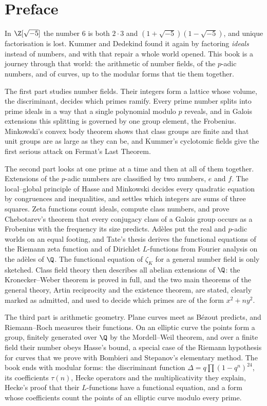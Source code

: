 \chapter*{Preface}
In $\Z[\sqrt{-5}]$ the number $6$ is both $2\cdot3$ and $(1+\sqrt{-5})(1-\sqrt{-5})$, and unique factorisation is lost.
Kummer and Dedekind found it again by factoring \emph{ideals} instead of numbers, and with that repair a whole world
opened. This book is a journey through that world: the arithmetic of number fields, of the $p$-adic numbers, and of
curves, up to the modular forms that tie them together.

The first part studies number fields. Their integers form a lattice whose volume, the discriminant, decides which primes
ramify. Every prime number splits into prime ideals in a way that a single polynomial modulo $p$ reveals, and in Galois
extensions this splitting is governed by one group element, the Frobenius. Minkowski's convex body theorem shows that
class groups are finite and that unit groups are as large as they can be, and Kummer's cyclotomic fields give the
first serious attack on Fermat's Last Theorem.

The second part looks at one prime at a time and then at all of them together. Extensions of the $p$-adic numbers are
classified by two numbers, $e$ and $f$. The local--global principle of Hasse and Minkowski decides every quadratic
equation by congruences and inequalities, and settles which integers are sums of three squares. Zeta functions count
ideals, compute class numbers, and prove Chebotarev's theorem that every conjugacy class of a Galois group occurs as a
Frobenius with the frequency its size predicts. Ad\`eles put the real and $p$-adic worlds on an equal footing, and
Tate's thesis derives the functional equations of the Riemann zeta function and of Dirichlet $L$-functions from Fourier analysis on the ad\`eles of $\Q$. The functional equation of $\zeta_K$ for a general number field is only sketched. Class field theory
then describes all abelian extensions of $\Q$: the Kronecker--Weber theorem is proved in full, and the two main theorems
of the general theory, Artin reciprocity and the existence theorem, are stated, clearly marked as admitted, and used to
decide which primes are of the form $x^2+ny^2$.

The third part is arithmetic geometry. Plane curves meet as Bézout predicts, and Riemann--Roch measures their functions.
On an elliptic curve the points form a group, finitely generated over $\Q$ by the Mordell--Weil theorem, and over a
finite field their number obeys Hasse's bound, a special case of the Riemann hypothesis for curves that we prove with
Bombieri and Stepanov's elementary method. The book ends with modular forms: the discriminant function
$\Delta=q\prod(1-q^n)^{24}$, its coefficients $\tau(n)$, Hecke operators and the multiplicativity they explain,
Hecke's proof that their $L$-functions have a functional equation, and a form whose coefficients count the points of an
elliptic curve modulo every prime.

